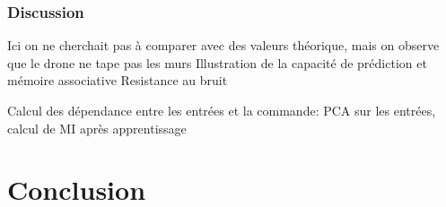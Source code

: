 \documentclass[../main]{subfiles}
\begin{document}
\subsubsection{Discussion}
Ici on ne cherchait pas à comparer avec des valeurs théorique, mais on observe que le drone ne tape pas les murs
Illustration de la capacité de prédiction et mémoire associative
Resistance au bruit

Calcul des dépendance entre les entrées et la commande:
PCA sur les entrées, calcul de MI après apprentissage

\section{Conclusion}


\ifSubfilesClassLoaded{
    \printbibliography
}{}
\end{document}
